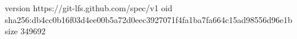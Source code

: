 version https://git-lfs.github.com/spec/v1
oid sha256:db4cc0b16f03d4ee00b5a72d0eec3927071f4fa1ba7fa664c15ad98556d96e1b
size 349692
